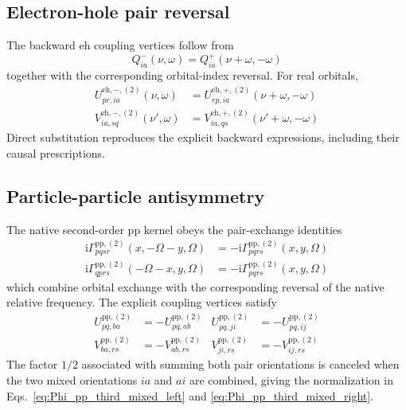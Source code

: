 \documentclass[aip,jcp,reprint,noshowkeys,superscriptaddress]{revtex4-1}
\newcommand{\ii}{\mathrm{i}}
\newcommand{\eh}{\text{eh}}
\newcommand{\pp}{\text{pp}}
\begin{document}
\subsection{Electron-hole pair reversal}

The backward $\eh$ coupling vertices follow from
\begin{equation}
    Q^-_{ia}(\nu,\omega)
    =
    Q^+_{ia}(\nu+\omega,-\omega)
    \label{eq:Q_reversal_third}
\end{equation}
together with the corresponding orbital-index reversal.
For real orbitals,
\begin{align}
    U^{\eh,-,(2)}_{pr,ia}(\nu,\omega)
    &=
    U^{\eh,+,(2)}_{rp,ia}(\nu+\omega,-\omega)
    \label{eq:U_eh_pair_reversal}
    \\
    V^{\eh,-,(2)}_{ia,sq}(\nu',\omega)
    &=
    V^{\eh,+,(2)}_{ia,qs}(\nu'+\omega,-\omega)
    \label{eq:V_eh_pair_reversal}
\end{align}
Direct substitution reproduces the explicit backward expressions, including
their causal prescriptions.

\subsection{Particle-particle antisymmetry}

The native second-order $\pp$ kernel obeys the pair-exchange identities
\begin{align}
    \ii\Gamma_{pqsr}^{\pp,(2)}(x,-\Omega-y,\Omega)
    &=
    -\ii\Gamma_{pqrs}^{\pp,(2)}(x,y,\Omega)
    \\
    \ii\Gamma_{qprs}^{\pp,(2)}(-\Omega-x,y,\Omega)
    &=
    -\ii\Gamma_{pqrs}^{\pp,(2)}(x,y,\Omega)
    \label{eq:Gamma_pp_pair_exchange}
\end{align}
which combine orbital exchange with the corresponding reversal of the native
relative frequency.
The explicit coupling vertices satisfy
\begin{align}
    U_{pq,ba}^{\pp,(2)}&=-U_{pq,ab}^{\pp,(2)}
    &
    U_{pq,ji}^{\pp,(2)}&=-U_{pq,ij}^{\pp,(2)}
    \\
    V_{ba,rs}^{\pp,(2)}&=-V_{ab,rs}^{\pp,(2)}
    &
    V_{ji,rs}^{\pp,(2)}&=-V_{ij,rs}^{\pp,(2)}
    \label{eq:UV_pp_antisymmetry}
\end{align}
The factor $1/2$ associated with summing both pair orientations is canceled
when the two mixed orientations $ia$ and $ai$ are combined, giving the
normalization in Eqs.~\eqref{eq:Phi_pp_third_mixed_left} and
\eqref{eq:Phi_pp_third_mixed_right}.
\end{document}
